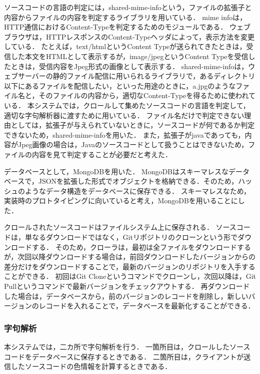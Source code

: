 \documentclass{cs-thesis}
\begin{document}
  ソースコードの言語の判定には，shared-mime-infoという，ファイルの拡張子と内容からファイルの内容を判定するライブラリを用いている．
  mime infoは，HTTP通信におけるContent-Typeを判定するためのモジュールである．
  ウェブブラウザは，HTTPレスポンスのContent-Typeヘッダによって，表示方法を変更している．
  たとえば，text/htmlというContent Typeが送られてきたときは，受信した本文をHTMLとして表示するが，image/jpegというContent Typeを受信したときは，受信内容をJpeg形式の画像として表示する．
  shared-mime-infoは，ウェブサーバーの静的ファイル配信に用いられるライブラリで，あるディレクトリ以下にあるファイルを配信したい，といった用途のときに，a.jpgのようなファイル名と，そのファイルの内容から，適切なContent-Typeを得るために使われている．
  本システムでは，クロールして集めたソースコードの言語を判定して，適切な字句解析器に渡すために用いている．
  ファイル名だけで判定できない理由としては，拡張子が与えられていないときに，ソースコードが何であるか判定できないため，shared-mime-infoを用いた．
  また，拡張子がjavaであっても，内容がJpeg画像の場合は，Javaのソースコードとして扱うことはできないため，ファイルの内容を見て判定することが必要だと考えた．

  データベースとして，MongoDBを用いた．
  MongoDBはスキーマレスなデータベースで，JSONを拡張した形式でオブジェクトを格納できる．そのため，ハッシュのようなデータ構造をデータベースに保存できる．
  スキーマレスなため，実装時のプロトタイピングに向いていると考え，MongoDBを用いることにした．

  クロールされたソースコードはファイルシステム上に保存される．
  ソースコードは，単なるダウンロードではなく，Gitリポジトリのクローンという形でダウンロードする．
  そのため，クローラは，最初は全ファイルをダウンロードするが，次回以降ダウンロードする場合は，前回ダウンロードしたバージョンからの差分だけをダウンロードすることで，最新のバージョンのリポジトリを入手することができる．
  初回はGit Cloneというコマンドでクローンし，次回以降は，Git Pullというコマンドで最新バージョンをチェックアウトする．
  再ダウンロードした場合は，データベースから，前のバージョンのレコードを削除し，新しいバージョンのレコードを入れることで，データベースを最新化することができる．


  \subsubsection{字句解析}

  本システムでは，二カ所で字句解析を行う．
  一箇所目は，クロールしたソースコードをデータベースに保存するときである．
  二箇所目は，クライアントが送信したソースコードの色情報を計算するときである．
\end{document}
